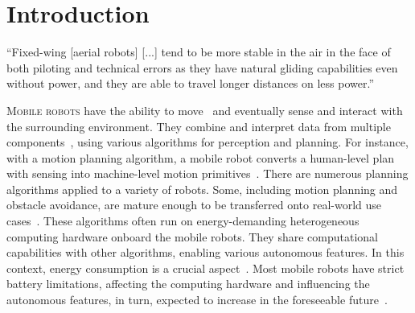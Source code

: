 
%
%
%
%
\chapter{Introduction}
\label{cp:intro}

\begin{chapquote}{\cite{wang2017curvature}}
  ``Fixed-wing [aerial robots] [...] tend to be more stable in the air in the face of both piloting and technical errors as they have natural gliding capabilities even without power, and they are able to travel longer distances on less power.''
\end{chapquote}

\vspace*{1em}

\lettrine{M}{obile robots} have the ability to move~\citep{corke2017robotics} and eventually sense and interact with the surrounding environment. They combine and interpret data from multiple components~\citep{mei2006deployment}, using various algorithms for perception and planning. For instance, with a motion planning algorithm, a mobile robot converts a human-level plan with sensing into machine-level motion primitives~\citep{lavalle2006planning}. There are numerous planning algorithms applied to a variety of robots. Some, including motion planning and obstacle avoidance, are mature enough to be transferred onto real-world use cases~\citep{siciliano2016bspringer}. These algorithms often run on energy-demanding heterogeneous computing hardware onboard the mobile robots. They share computational capabilities with other algorithms, enabling various autonomous features. In this context, energy consumption is a crucial aspect~\citep{jaiem2016step}. Most mobile robots have strict battery limitations, affecting the computing hardware and influencing the autonomous features, in turn, expected to increase in the foreseeable future~\citep{fisher2013verifying}.

